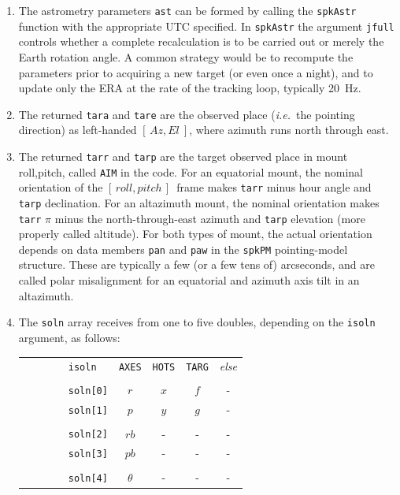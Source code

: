 \documentclass[11pt,fleqn,twoside,\paper]{article}
\renewcommand{\_}{{\tt\char'137}}     %
\newcommand{\azel}      {$[\,Az,El~]$}
\newcommand{\ropi}      {$[\,roll,pitch\,]$}
\begin{document}
{\begin{enumerate}
      contains seven coefficients, called IA, IB,
      VD, CA, NP, AW and AN.  A typical operational pointing model would
      contain a greater variety, each being mapped onto the most natural
      one of the seven.
\item The astrometry parameters {\tt ast} can be formed by calling the
      {\tt spkAstr} function with the appropriate UTC specified.  In
      {\tt spkAstr} the argument {\tt jfull} controls whether a complete
      recalculation is to be carried out or merely the Earth rotation
      angle.  A common strategy would be to recompute the parameters
      prior to acquiring a new target (or even once a night), and to
      update only the ERA at the rate of the tracking loop, typically
      20~Hz.
\item The returned {\tt tara} and {\tt tare} are the observed place
      ({\it i.e.}~the pointing direction) as left-handed \azel,
      where azimuth runs north through east.
\item The returned {\tt tarr} and {\tt tarp} are the target observed
      place in mount roll,pitch, called {\tt AIM} in the code.  For
      an equatorial mount, the nominal orientation of the \ropi\
      frame makes {\tt tarr} minus hour angle and {\tt tarp}
      declination.  For an altazimuth mount, the nominal orientation
      makes {\tt tarr} $\pi$ minus the north-through-east azimuth and
      {\tt tarp} elevation (more properly called altitude).  For both
      types of mount, the actual orientation depends on data members
      {\tt pan} and {\tt paw} in the {\tt spkPM} pointing-model
      structure.  These are typically a few (or a few tens of)
      arcseconds, and are called polar misalignment for an equatorial
      and azimuth axis tilt in an altazimuth.
\item The {\tt soln} array receives from one to five doubles, depending
      on the {\tt isoln} argument, as follows:

      \begin{tabular}{c l c c c c}
         ~~~~~~ & {\tt isoln} & {\tt AXES} & {\tt HOTS} & {\tt TARG} & {\it else} \\
         \\
         ~~~~~~ & {\tt soln[0]} & $r$      &  $x$  &  $f$  &  - \\
         ~~~~~~ & {\tt soln[1]} & $p$      &  $y$  &  $g$  &  - \\
         \\
         ~~~~~~ & {\tt soln[2]} & $rb$     &  -    &  -    &  - \\
         ~~~~~~ & {\tt soln[3]} & $pb$     &  -    &  -    &  - \\
         \\
         ~~~~~~ & {\tt soln[4]} & $\theta$ &  -    &  -    &  - \\
      \end{tabular}


\end{enumerate}}
\end{document}
